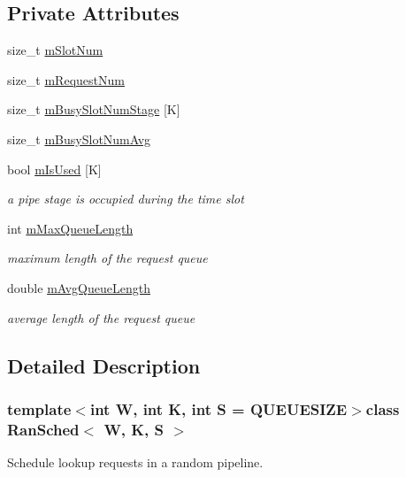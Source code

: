 \subsection*{Private Attributes}
\begin{DoxyCompactItemize}
\item 
size\-\_\-t \hyperlink{classRanSched_ab846e49a0f4dadfbae2a394af599164c}{m\-Slot\-Num}
\item 
size\-\_\-t \hyperlink{classRanSched_ad79f85e0945332c83f94c815fed24181}{m\-Request\-Num}
\item 
size\-\_\-t \hyperlink{classRanSched_a80d8fc5fae90473bba4343b3daa7eb77}{m\-Busy\-Slot\-Num\-Stage} \mbox{[}K\mbox{]}
\item 
size\-\_\-t \hyperlink{classRanSched_adf97c2280f441eee70c102bae65ef4b6}{m\-Busy\-Slot\-Num\-Avg}
\item 
bool \hyperlink{classRanSched_a2919a4a797f648a0d21c1c24132a4c90}{m\-Is\-Used} \mbox{[}K\mbox{]}
\begin{DoxyCompactList}\small\item\em a pipe stage is occupied during the time slot \end{DoxyCompactList}\item 
int \hyperlink{classRanSched_a9457935e91ae686748d8d458b5ed9c2c}{m\-Max\-Queue\-Length}
\begin{DoxyCompactList}\small\item\em maximum length of the request queue \end{DoxyCompactList}\item 
double \hyperlink{classRanSched_a7e8a77245e7cd58fd16c192a89bd5e89}{m\-Avg\-Queue\-Length}
\begin{DoxyCompactList}\small\item\em average length of the request queue \end{DoxyCompactList}\end{DoxyCompactItemize}


\subsection{Detailed Description}
\subsubsection*{template$<$int W, int K, int S = Q\-U\-E\-U\-E\-S\-I\-Z\-E$>$class Ran\-Sched$<$ W, K, S $>$}

Schedule lookup requests in a random pipeline. 

